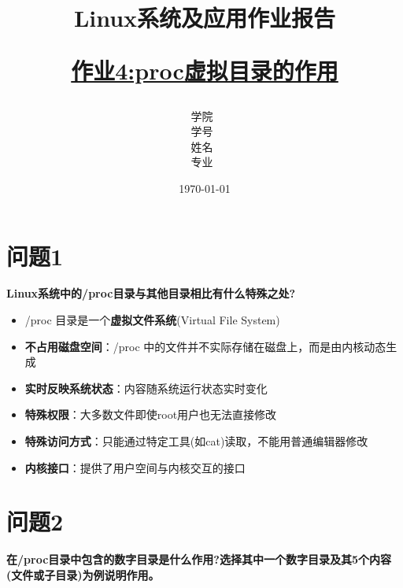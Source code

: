 \documentclass[12pt,hyperref,a4paper,UTF8]{ctexart}
\title{ 
        \vspace{1cm}
        \heiti \Huge \textbf{Linux系统及应用作业报告} \par
        \vspace{1cm} 
        \heiti \Large {\underline{作业4:proc虚拟目录的作用}   } 
        \vspace{3cm}
    
    }
\author{
        \vspace{0.5cm}
        \kaishu\Large 学院\ \dlmu[9cm]{卓越学院} \\ %
        \vspace{0.5cm}
        \kaishu\Large 学号\ \dlmu[9cm]{23040447} \\ %
        \vspace{0.5cm}
        \kaishu\Large 姓名\ \dlmu[9cm]{陈文轩} \qquad  \\ %
        \vspace{0.5cm}
        \kaishu\Large 专业\ \dlmu[9cm]{智能硬件与系统(电子信息工程)} \qquad \\ %
    }
\date{\today} %
\begin{document}
\cover
\thispagestyle{empty} %







\newpage
\setcounter{page}{1} %


\section{问题1}

\textbf{Linux系统中的/proc目录与其他目录相比有什么特殊之处?}

\begin{itemize}
    \item /proc 目录是一个\textbf{虚拟文件系统}(Virtual File System) \cite{man7}  
    \item \textbf{不占用磁盘空间}：/proc 中的文件并不实际存储在磁盘上，而是由内核动态生成 \cite{kernel-doc}  
    \item \textbf{实时反映系统状态}：内容随系统运行状态实时变化
    \item \textbf{特殊权限}：大多数文件即使root用户也无法直接修改 \cite{ubuntu}  
    \item \textbf{特殊访问方式}：只能通过特定工具(如cat)读取，不能用普通编辑器修改
    \item \textbf{内核接口}：提供了用户空间与内核交互的接口 \cite{ibm}  
\end{itemize}

\section{问题2}

\textbf{在/proc目录中包含的数字目录是什么作用?选择其中一个数字目录及其5个内容(文件或子目录)为例说明作用。}
\end{document}
